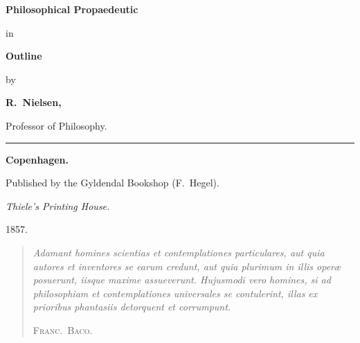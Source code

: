 \documentclass[12pt]{book}
\begin{document}
\begin{titlepage}
\centering
\vspace*{2.2cm}
{\Huge\bfseries Philosophical Propaedeutic\par}
\vspace{1.1cm}
{\LARGE in\par}
\vspace{0.9cm}
{\LARGE\bfseries Outline\par}
\vspace{1.1cm}
{\large by\par}
\vspace{0.9cm}
{\LARGE\bfseries R.\ Nielsen,\par}
\vspace{0.2cm}
{\normalsize Professor of Philosophy.\par}
\vspace{2.2cm}
\rule{4cm}{0.4pt}\par
\vspace{1.6cm}
{\large\bfseries Copenhagen.\par}
\vspace{0.4cm}
{\normalsize Published by the Gyldendal Bookshop (F.\ Hegel).\par}
\vspace{0.3cm}
{\small\emph{Thiele's Printing House.}\par}
\vspace{0.6cm}
{\large 1857.\par}
\end{titlepage}

\frontmatter

\thispagestyle{empty}
\vspace*{0.34\textheight}
\begin{quote}
\itshape\noindent Adamant homines scientias et contemplationes particulares, aut
quia autores et inventores se earum credunt, aut quia plurimum in illis operæ
posuerunt, iisque maxime assueverunt. Hujusmodi vero homines, si ad philosophiam
et contemplationes universales se contulerint, illas ex prioribus phantasiis
detorquent et corrumpunt.
\par\vspace{6pt}\normalfont\hfill\textsc{Franc.\ Baco.}
\par\vspace{14pt}
\small{}
\end{quote}
\end{document}
